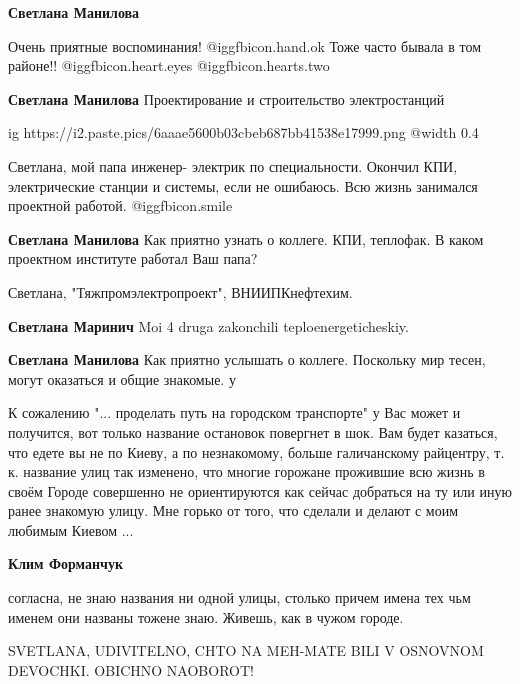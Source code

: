 \begin{itemize}
\begin{itemize}
\textbf{Светлана Манилова} 

Очень приятные воспоминания!  @igg{fbicon.hand.ok} Тоже часто бывала в том
районе!!  @igg{fbicon.heart.eyes}  @igg{fbicon.hearts.two} 

\textbf{Светлана Манилова} Проектирование и строительство электростанций

\ifcmt
  ig https://i2.paste.pics/6aaae5600b03cbeb687bb41538e17999.png
  @width 0.4
\fi


Светлана, мой папа инженер- электрик по специальности. Окончил КПИ,
электрические станции и системы, если не ошибаюсь. Всю жизнь занимался
проектной работой. @igg{fbicon.smile} 


\textbf{Светлана Манилова} Как приятно узнать о коллеге. КПИ, теплофак. В каком проектном институте работал Ваш папа?

Светлана, "Тяжпромэлектропроект", ВНИИПКнефтехим.

\textbf{Светлана Маринич} Moi 4 druga zakonchili teploenergeticheskiy.

\textbf{Светлана Манилова} Как приятно услышать о коллеге. Поскольку мир тесен, могут оказаться и общие знакомые. у

\end{itemize} %


К сожалению "... проделать путь на городском транспорте" у Вас может и
получится, вот только название остановок повергнет в шок. Вам будет казаться,
что едете вы не по Киеву, а по незнакомому, больше галичанскому райцентру, т. к.
название улиц так изменено, что многие горожане прожившие всю жизнь в своём
Городе совершенно не ориентируются как сейчас добраться на ту или иную ранее
знакомую улицу. Мне горько от того, что сделали и делают с моим любимым Киевом
...

\begin{itemize} %
\textbf{Клим Форманчук} 

согласна, не знаю названия ни одной улицы, столько причем имена тех чьм именем
они названы тожене знаю. Живешь, как в чужом городе.

\end{itemize} %


SVETLANA, UDIVITELNO, CHTO NA MEH-MATE BILI V OSNOVNOM DEVOCHKI. OBICHNO
NAOBOROT!


\end{itemize}
